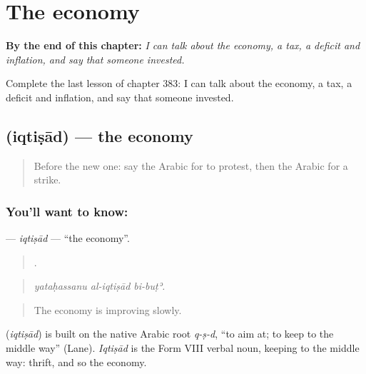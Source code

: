 
\chapter{The economy}
\label{ch:ar-the-economy}

\begin{chapteropening}
\textbf{By the end of this chapter:} \emph{I can talk about the economy, a tax, a deficit and inflation, and say that someone invested.}

Complete the last lesson of chapter 383: I can talk about the economy, a tax, a deficit and inflation, and say that someone invested.
\end{chapteropening}

\section[\texorpdfstring{\ar{اقتصاد} (iqtiṣād)}{اقتصاد (iqtiṣād)}]{ (iqtiṣād) — the economy}

\label{lesson:AR-C383-iqtisad}



\begin{quote}
Before the new one: say the Arabic for to protest, then the Arabic for a strike.
\end{quote}

\subsection*{You'll want to know: }
\textbf{} — \emph{iqtiṣād} — \textquotedblleft{}the economy\textquotedblright{}.

\begin{quote}
  .
\end{quote}

\begin{quote}
\emph{yataḥassanu al-iqtiṣād bi-buṭʾ.}
\end{quote}

\begin{quote}
The economy is improving slowly.
\end{quote}

\begin{cousinweb}
\textbf{} (\emph{iqtiṣād}) is built on the native Arabic root \emph{q-ṣ-d}, \textquotedblleft{}to aim at; to keep to the middle way\textquotedblright{} (Lane). \emph{Iqtiṣād} is the Form VIII verbal noun, keeping to the middle way: thrift, and so the economy.
\end{cousinweb}

